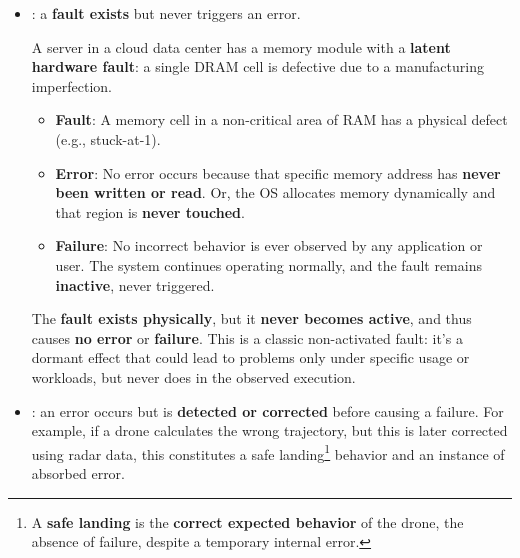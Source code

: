 \begin{itemize}[label=\textcolor{Green3}{}]
    \item {}: a \textbf{fault exists} but never triggers an error.
    
    \begin{examplebox}
        A server in a cloud data center has a memory module with a \textbf{latent hardware fault}: a single DRAM cell is defective due to a manufacturing imperfection.
        \begin{itemize}
            \item[\textcolor{Red2}{\faIcon{exclamation-triangle}}] \textbf{Fault}: A memory cell in a non-critical area of RAM has a physical defect (e.g., stuck-at-1).
            \item[\textcolor{Green3}{\faIcon{check}}] \textbf{Error}: No error occurs because that specific memory address has \textbf{never been written or read}. Or, the OS allocates memory dynamically and that region is \textbf{never touched}.
            \item[\textcolor{Green3}{\faIcon{check}}] \textbf{Failure}: No incorrect behavior is ever observed by any application or user. The system continues operating normally, and the fault remains \textbf{inactive}, never triggered.
        \end{itemize}
        The \textbf{fault exists physically}, but it \textbf{never becomes active}, and thus causes \textbf{no error} or \textbf{failure}. This is a classic non-activated fault: it's a dormant effect that could lead to problems only under specific usage or workloads, but never does in the observed execution.
    \end{examplebox}

    \item {}: an error occurs but is \textbf{detected or corrected} before causing a failure. For example, if a drone calculates the wrong trajectory, but this is later corrected using radar data, this constitutes a safe landing\footnote{
        A \textbf{safe landing} is the \textbf{correct expected behavior} of the drone, the absence of failure, despite a temporary internal error.
    } behavior and an instance of absorbed error.
\end{itemize}

